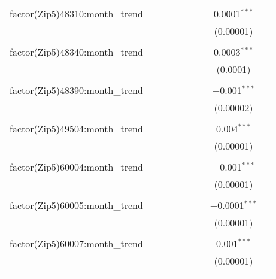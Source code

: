 \begin{table}[H]
{\begin{tabular}{@{\extracolsep{5pt}}lcccccccc}
  factor(Zip5)48310:month\_trend &  &  &  &  &  &  & 0.0001$^{***}$ &  \\  

   &  &  &  &  &  &  & (0.00001) &  \\  

   & & & & & & & & \\  

  factor(Zip5)48340:month\_trend &  &  &  &  &  &  & 0.0003$^{***}$ &  \\  

   &  &  &  &  &  &  & (0.0001) &  \\  

   & & & & & & & & \\  

  factor(Zip5)48390:month\_trend &  &  &  &  &  &  & $-$0.001$^{***}$ &  \\  

   &  &  &  &  &  &  & (0.00002) &  \\  

   & & & & & & & & \\  

  factor(Zip5)49504:month\_trend &  &  &  &  &  &  & 0.004$^{***}$ &  \\  

   &  &  &  &  &  &  & (0.00001) &  \\  

   & & & & & & & & \\  

  factor(Zip5)60004:month\_trend &  &  &  &  &  &  & $-$0.001$^{***}$ &  \\  

   &  &  &  &  &  &  & (0.00001) &  \\  

   & & & & & & & & \\  

  factor(Zip5)60005:month\_trend &  &  &  &  &  &  & $-$0.0001$^{***}$ &  \\  

   &  &  &  &  &  &  & (0.00001) &  \\  

   & & & & & & & & \\  

  factor(Zip5)60007:month\_trend &  &  &  &  &  &  & 0.001$^{***}$ &  \\  

   &  &  &  &  &  &  & (0.00001) &  \\  

   & & & & & & & & \\  


\end{tabular}}
\end{table}
